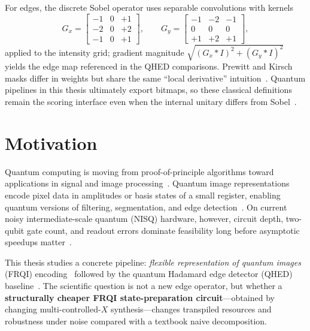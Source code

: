 For edges, the discrete Sobel operator uses separable convolutions with kernels
\begin{equation}
G_x = \begin{bmatrix}-1&0&+1\\-2&0&+2\\-1&0&+1\end{bmatrix},\qquad
G_y = \begin{bmatrix}-1&-2&-1\\0&0&0\\+1&+2&+1\end{bmatrix},
\end{equation}
applied to the intensity grid; gradient magnitude $\sqrt{(G_x*I)^2+(G_y*I)^2}$ yields the edge map referenced in the QHED comparisons. Prewitt and Kirsch masks differ in weights but share the same ``local derivative'' intuition~\cite{Zhou2019PrewittNEQR,Xu2020Kirsch}. Quantum pipelines in this thesis ultimately export bitmaps, so these classical definitions remain the scoring interface even when the internal unitary differs from Sobel~\cite{Yao2017QHED}.

\section{Motivation}
Quantum computing is moving from proof-of-principle algorithms toward applications in signal and image processing~\cite{Ruan2021OpportunitiesChallenges,Wang2022ReviewQIP,Farooq2025SystematicReview}. Quantum image representations encode pixel data in amplitudes or basis states of a small register, enabling quantum versions of filtering, segmentation, and edge detection~\cite{Le2011FRQI,Yao2017QHED}. On current noisy intermediate-scale quantum (NISQ) hardware, however, circuit depth, two-qubit gate count, and readout errors dominate feasibility long before asymptotic speedups matter~\cite{Preskill2018NISQ,Geng2022HybridNISQEdge,Geng2023ImprovedFRQI}.

This thesis studies a concrete pipeline: \emph{flexible representation of quantum images} (FRQI) encoding~\cite{Le2011FRQI} followed by the quantum Hadamard edge detector (QHED) baseline~\cite{Yao2017QHED,QiskitTextbookQuantumEdgeDetection}. The scientific question is not a new edge operator, but whether a \textbf{structurally cheaper FRQI state-preparation circuit}---obtained by changing multi-controlled-$X$ synthesis---changes transpiled resources and robustness under noise compared with a textbook naive decomposition.

